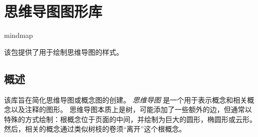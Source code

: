 %
%
%


\section{思维导图图形库}

\begin{tikzlibrary}{mindmap}

    该包提供了用于绘制思维导图的样式。
\end{tikzlibrary}

\subsection{概述}


该库旨在简化思维导图或概念图的创建。 \emph{思维导图} 是一个用于表示概念和相关概念以及注释的图形。 思维导图本质上是树，可能添加了一些额外的边，但通常以特殊的方式绘制：根概念位于页面的中间，并绘制为巨大的圆形，椭圆形或云形。 然后，相关的概念通过类似树枝的卷须``离开''这个根概念。


